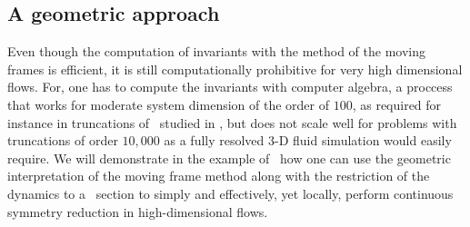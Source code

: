 \subsection{A geometric approach}
\label{s:laserMFnum}

Even though the computation of invariants with the method of
the moving frames is efficient, it is still computationally
prohibitive for very high dimensional flows. For, one has
to compute the invariants with computer algebra, a proccess 
that works for moderate system dimension of the order of $100$,
as required for instance in truncations of \KSe\ studied in ,
but does not scale well for problems with truncations of order $10,000$ as
a fully resolved $3$-D fluid simulation would easily require.
We will demonstrate in the example of \CLe\ 
how one can use the geometric interpretation of the moving frame method along
with the restriction of the dynamics to a \Poincare\ section
to simply and effectively, yet locally, perform continuous symmetry
reduction in high-dimensional flows.

